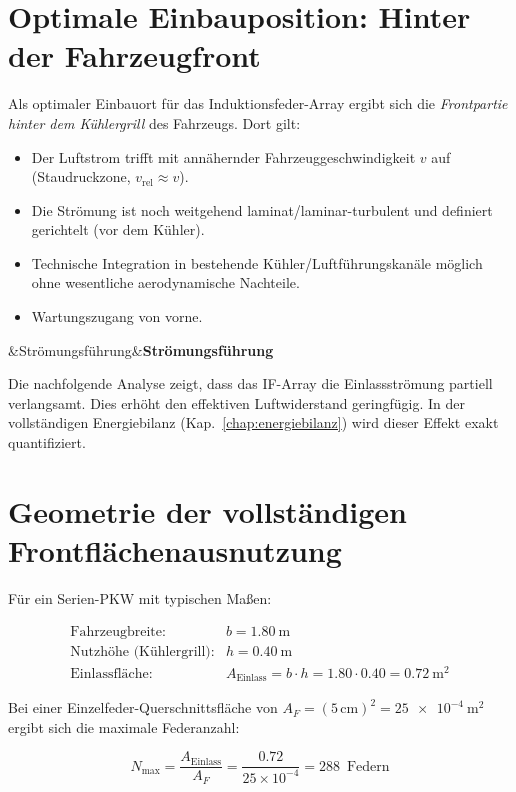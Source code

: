 ﻿\documentclass[12pt, a4paper]{report}
\newenvironment{hinweis}[1][]{%
  \begin{hinweisframe}\sloppy%
  \ifx&#1&\else\textbf{#1}\par\smallskip\fi}{\end{hinweisframe}}
\theoremstyle{definition}
\theoremstyle{remark}
\newcommand{\Aeinlass}{A_{\text{Einlass}}}
\begin{document}
\section{Optimale Einbauposition: Hinter der Fahrzeugfront}

Als optimaler Einbauort für das Induktionsfeder-Array ergibt sich die
\emph{Frontpartie hinter dem Kühlergrill} des Fahrzeugs. Dort gilt:

\begin{itemize}
  \item Der Luftstrom trifft mit annähernder Fahrzeuggeschwindigkeit $v$ auf
        (Staudruckzone, $v_{\text{rel}} \approx v$).
  \item Die Strömung ist noch weitgehend laminat/laminar-turbulent und
        definiert gerichtelt (vor dem Kühler).
  \item Technische Integration in bestehende Kühler/Luftführungskanäle
        möglich ohne wesentliche aerodynamische Nachteile.
  \item Wartungszugang von vorne.
\end{itemize}

\begin{hinweis}[Strömungsführung]
  Die nachfolgende Analyse zeigt, dass das IF-Array die Einlassströmung
  partiell verlangsamt. Dies erhöht den effektiven Luftwiderstand geringfügig.
  In der vollständigen Energiebilanz (Kap.~\ref{chap:energiebilanz}) wird
  dieser Effekt exakt quantifiziert.
\end{hinweis}

\section{Geometrie der vollständigen Frontflächenausnutzung}

Für ein Serien-PKW mit typischen Maßen:

\begin{align}
  \text{Fahrzeugbreite: } & b = \SI{1.80}{\metre} \\
  \text{Nutzhöhe (Kühlergrill):} & h = \SI{0.40}{\metre} \\
  \text{Einlassfläche:} & \Aeinlass = b \cdot h = 1.80 \cdot 0.40 = \SI{0.72}{\metre\squared}
  \label{eq:a_einlass}
\end{align}

Bei einer Einzelfeder-Querschnittsfläche von $A_F = (5\,\text{cm})^2 = \SI{25e-4}{\metre\squared}$
ergibt sich die maximale Federanzahl:

\begin{equation}
  N_{\text{max}} = \frac{\Aeinlass}{A_F} = \frac{0.72}{25 \times 10^{-4}} = 288\,\text{ Federn}
  \label{eq:n_federn}
\end{equation}
\end{document}
